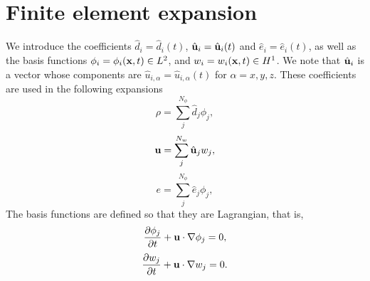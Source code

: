 \documentclass[11pt]{article}
\begin{document}
\section{Finite element expansion}
We introduce the coefficients $\hat{d}_i = \hat{d}_i(t)$, $\hat{\mathbf{u}}_i = \hat{\mathbf{u}}_i(t)$ and $\hat{e}_i = \hat{e}_i(t)$, as well as the basis functions $\phi_i = \phi_i(\mathbf{x},t) \in L^2$, and $w_i = w_i(\mathbf{x},t) \in H^1$. We note that $\hat{\mathbf{u}}_i$ is a vector whose components are $\hat{u}_{i,\alpha} = \hat{u}_{i,\alpha}(t)$ for $\alpha = x,y,z$. These coefficients are used in the following expansions
\begin{equation}
    \rho = \sum_j^{N_\phi} \hat{d}_j \phi_j,
\end{equation}
\begin{equation}
    \mathbf{u} = \sum_j^{N_w} \hat{\mathbf{u}}_j w_j,
\end{equation}
\begin{equation}
    e = \sum_j^{N_\phi} \hat{e}_j \phi_j,
\end{equation}
The basis functions are defined so that they are Lagrangian, that is,
\begin{equation}
    \frac{\partial \phi_j}{\partial t} + \mathbf{u} \cdot \nabla \phi_j = 0,
\end{equation}
\begin{equation}
    \frac{\partial w_j}{\partial t} + \mathbf{u} \cdot \nabla w_j = 0.
\end{equation}

\end{document}
